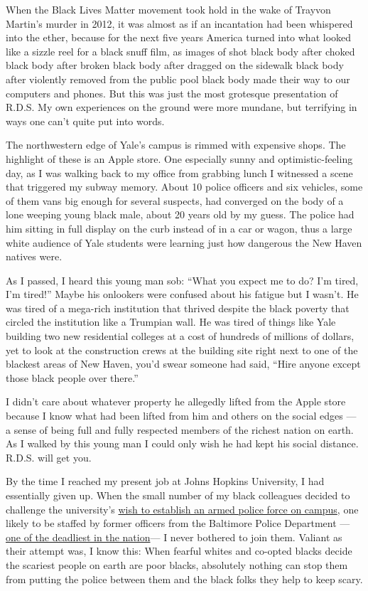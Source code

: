 When the Black Lives Matter movement took hold in the wake of Trayvon
Martin's murder in 2012, it was almost as if an incantation had been
whispered into the ether, because for the next five years America turned
into what looked like a sizzle reel for a black snuff film, as images of
shot black body after choked black body after broken black body after
dragged on the sidewalk black body after violently removed from the
public pool black body made their way to our computers and phones. But
this was just the most grotesque presentation of R.D.S. My own
experiences on the ground were more mundane, but terrifying in ways one
can't quite put into words.

The northwestern edge of Yale's campus is rimmed with expensive shops.
The highlight of these is an Apple store. One especially sunny and
optimistic-feeling day, as I was walking back to my office from grabbing
lunch I witnessed a scene that triggered my subway memory. About 10
police officers and six vehicles, some of them vans big enough for
several suspects, had converged on the body of a lone weeping young
black male, about 20 years old by my guess. The police had him sitting
in full display on the curb instead of in a car or wagon, thus a large
white audience of Yale students were learning just how dangerous the New
Haven natives were.

As I passed, I heard this young man sob: ``What you expect me to do? I'm
tired, I'm tired!'' Maybe his onlookers were confused about his fatigue
but I wasn't. He was tired of a mega-rich institution that thrived
despite the black poverty that circled the institution like a Trumpian
wall. He was tired of things like Yale building two new residential
colleges at a cost of hundreds of millions of dollars, yet to look at
the construction crews at the building site right next to one of the
blackest areas of New Haven, you'd swear someone had said, ``Hire anyone
except those black people over there.''

I didn't care about whatever property he allegedly lifted from the Apple
store because I know what had been lifted from him and others on the
social edges --- a sense of being full and fully respected members of
the richest nation on earth. As I walked by this young man I could only
wish he had kept his social distance. R.D.S. will get you.

By the time I reached my present job at Johns Hopkins University, I had
essentially given up. When the small number of my black colleagues
decided to challenge the university's
\href{https://publicsafetyinitiatives.jhu.edu/assets/uploads/sites/8/2019/01/proposal_summary.pdf}{wish
to establish an armed police force on campus}, one likely to be staffed
by former officers from the Baltimore Police Department
---\href{https://mappingpoliceviolence.org/compare-police-departments}{one
of the deadliest in the nation}--- I never bothered to join them.
Valiant as their attempt was, I know this: When fearful whites and
co-opted blacks decide the scariest people on earth are poor blacks,
absolutely nothing can stop them from putting the police between them
and the black folks they help to keep scary.

